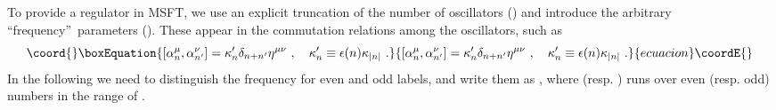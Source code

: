 \documentclass[a4paper,aps,preprint,nofootinbib,eqsecnum]{revtex4}
\begin{document}
To provide a regulator in MSFT, we use an explicit truncation of the number
of oscillators (\coordHE{}) and introduce the \coordHE{} arbitrary
\textquotedblleft frequency\textquotedblright\ parameters \coordHE{} (\coordHE{}). These appear in the commutation relations among the
oscillators, such as
\begin{equation}\coord{}\boxEquation{
\lbrack \alpha _{n}^{\mu },\alpha _{n^{\prime }}^{\nu }]=\kappa _{n}^{\prime
}\delta _{n+n^{\prime }}\eta ^{\mu \nu }\,\,,\quad \kappa _{n}^{\prime
}\equiv \epsilon (n)\kappa _{|n|}\,\,.  \label{osc_comm}
}{
\lbrack \alpha _{n}^{\mu },\alpha _{n^{\prime }}^{\nu }]=\kappa _{n}^{\prime
}\delta _{n+n^{\prime }}\eta ^{\mu \nu }\,\,,\quad \kappa _{n}^{\prime
}\equiv \epsilon (n)\kappa _{|n|}\,\,.  }{ecuacion}\coordE{}\end{equation}%
In the following we need to distinguish the frequency for even and odd
labels, and write them as \coordHE{}, \coordHE{}
where \coordHE{} (resp. \coordHE{}) runs over even (resp. odd) numbers in the range of \coordHE{}%
.
\end{document}
